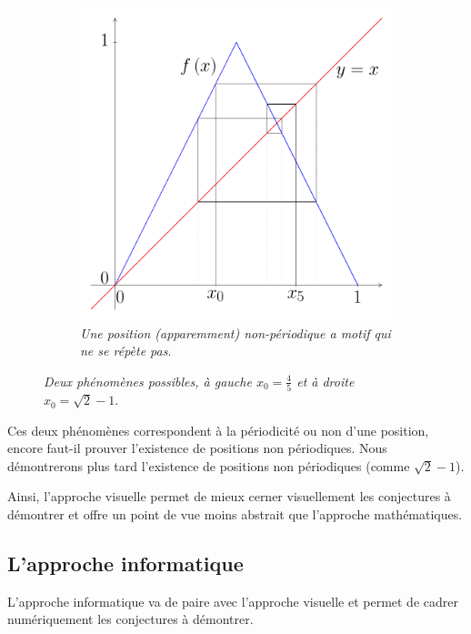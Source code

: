 \documentclass[a4paper,french,12pt]{article}
\begin{document}
\begin{center}
\begin{figure}[H]
\begin{subfigure}[b]{0.4\textwidth}
    \includegraphics[scale=0.45]{../TeXGraph/Pdf/courbe_suite_phenomene_1.pdf}
    \caption{\emph{Une position (apparemment) non-périodique a motif qui ne se répète pas}.}
    \label{fig:f2}
  \end{subfigure}
  \caption{\emph{Deux phénomènes possibles, à gauche $x_0=\frac{4}{5}$ et à droite $x_0=\sqrt{2}-1$}.}
\end{figure}
\end{center}

\vspace*{-1cm}

Ces deux phénomènes correspondent à la périodicité ou non d'une position, encore faut-il prouver l'existence de positions non périodiques. Nous démontrerons plus tard l'existence de positions non périodiques (comme $\sqrt{2}-1$). 

Ainsi, l'approche visuelle permet de mieux cerner visuellement les conjectures à démontrer et offre un point de vue moins abstrait que l'approche mathématiques.


\subsection{L'approche informatique}
L'approche informatique va de paire avec l'approche visuelle et permet de cadrer numériquement les conjectures à démontrer.
\end{document}
